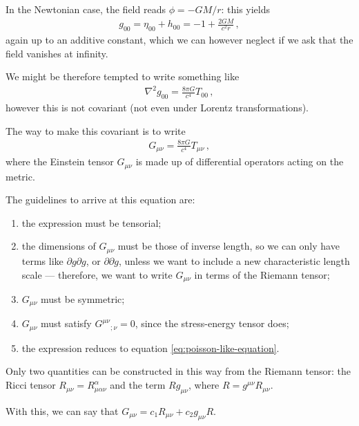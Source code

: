 \documentclass[main.tex]{subfiles}
\begin{document}
In the Newtonian case, the field reads \(\phi = - GM / r\): this yields 
%
\begin{align}
g_{00} = \eta_{00} + h_{00} = - 1 + \frac{2GM}{c^2 r}
\,,
\end{align}
%
again up to an additive constant, which we can however neglect if we ask that the field vanishes at infinity. 

We might be therefore tempted to write something like 
%
\begin{align} \label{eq:poisson-like-equation}
\nabla^2 g_{00} = \frac{8 \pi G}{c^{4}} T_{00} 
\,,
\end{align}
%
however this is not covariant (not even under Lorentz transformations). 

The way to make this covariant is to write 
%
\begin{align}
G_{\mu \nu } = \frac{8 \pi G}{c^{4}} T_{\mu \nu }
\,,
\end{align}
%
where the Einstein tensor \(G_{\mu \nu }\) is made up of differential operators acting on the metric. 

The guidelines to arrive at this equation are: 
\begin{enumerate}
    \item the expression must be tensorial;
    \item the dimensions of \(G_{\mu \nu }\) must be those of inverse length, so we can only have terms like \(\partial g \partial g\), or \(\partial \partial g\), unless we want to include a new characteristic length scale --- therefore, we want to write \(G_{\mu \nu }\) in terms of the Riemann tensor;
    \item \(G_{\mu \nu }\) must be symmetric;
    \item \(G_{\mu \nu }\) must satisfy \(G^{\mu \nu }{}_{; \nu } = 0\), since the stress-energy tensor does; 
    \item the expression reduces to equation \eqref{eq:poisson-like-equation}.
\end{enumerate}

Only two quantities can be constructed in this way from the Riemann tensor: the Ricci tensor \(R_{\mu \nu } = R^{\alpha }_{\mu \alpha \nu }\) and the term \(R g_{\mu \nu }\), where \(R = g^{\mu \nu } R_{\mu \nu }\). 

With this, we can say that \(G_{\mu \nu } = c_1 R_{\mu \nu } + c_2 g_{\mu \nu } R\). 
\end{document}
